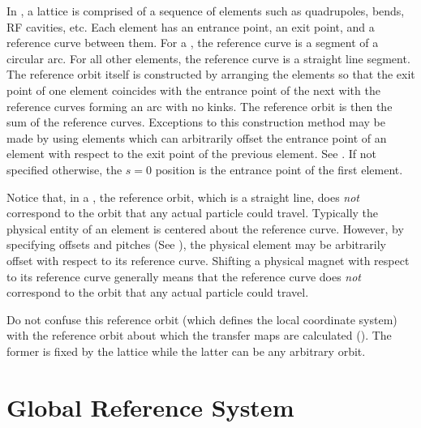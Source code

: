 In \bmad, a lattice is comprised of a sequence of elements such as
quadrupoles, bends, RF cavities, etc. Each element has an entrance
point, an exit point, and a reference curve between them. For a
, the reference curve is a segment of a circular arc. For all
other elements, the reference curve is a straight line segment. The
reference orbit itself is constructed by arranging the elements so
that the exit point of one element coincides with the entrance point
of the next with the reference curves forming an arc with no kinks.
The reference orbit is then the sum of the reference
curves. Exceptions to this construction method may be made by using
 elements which can arbitrarily offset the entrance point of
an element with respect to the exit point of the previous element.
See .  If not specified otherwise, the $s = 0$ position
is the entrance point of the first element.

Notice that, in a , the reference orbit, which is a
straight line, does {\em not} correspond to the orbit that any actual
particle could travel. Typically the physical entity of an element is
centered about the reference curve. However, by specifying offsets and
pitches (See ), the physical element may be
arbitrarily offset with respect to its reference curve.  Shifting a
physical magnet with respect to its reference curve generally means
that the reference curve does {\em not} correspond to the orbit that
any actual particle could travel.

Do not confuse this reference orbit (which defines the local
coordinate system) with the reference orbit about which the transfer
maps are calculated (). The former is fixed by the
lattice while the latter can be any arbitrary orbit.

\section{Global Reference System}
\label{s:global}

